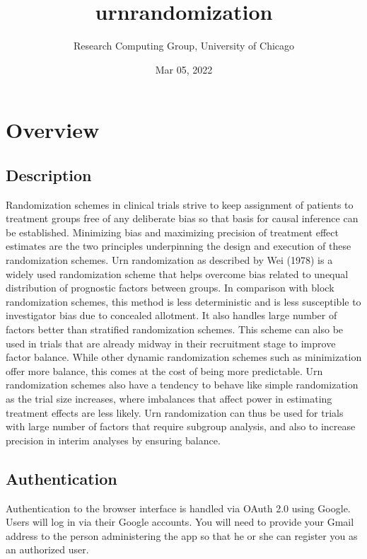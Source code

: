 \documentclass[letterpaper,10pt,english]{sphinxmanual}
\title{urn\sphinxhyphen{}randomization}
\date{Mar 05, 2022}
\author{Research Computing Group, University of Chicago}
\begin{document}
\pagestyle{empty}
\sphinxmaketitle
\pagestyle{plain}
\sphinxtableofcontents
\pagestyle{normal}
\label{\detokenize{index::doc}}



\chapter{Overview}
\label{\detokenize{overview:overview}}\label{\detokenize{overview::doc}}

\section{Description}
\label{\detokenize{overview:description}}
Randomization schemes in clinical trials strive to keep assignment of patients to treatment groups free of any deliberate
bias so that basis for causal inference can be established. Minimizing bias and maximizing precision of treatment
effect estimates are the two principles underpinning the design and execution of these randomization schemes. Urn
randomization as described by Wei (1978) is a widely used randomization scheme that helps overcome bias related to
unequal distribution of prognostic factors between groups. In comparison with block randomization schemes, this method is
less deterministic and is less susceptible to investigator bias due to concealed allotment. It also handles large number
of factors better than stratified randomization schemes. This scheme can also be used in trials that are already midway
in their recruitment stage to improve factor balance. While other dynamic randomization schemes such as minimization offer
more balance, this comes at the cost of being more predictable. Urn randomization schemes also have a tendency to behave
like simple randomization as the trial size increases, where imbalances that affect power in estimating treatment effects
are less likely. Urn randomization can thus be used for trials with large number of factors that require subgroup analysis,
and also to increase precision in interim analyses by ensuring balance.


\section{Authentication}
\label{\detokenize{overview:authentication}}
Authentication to the browser interface is handled via OAuth 2.0 using Google. Users will log in via their Google accounts.
You will need to provide your Gmail address to the person administering the app so that he or she can register you as an
authorized user.
\end{document}
